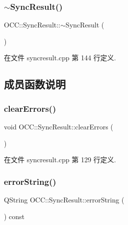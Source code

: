 \subsubsection{\texorpdfstring{$\sim$\+Sync\+Result()}{~SyncResult()}}
{\footnotesize\ttfamily O\+C\+C\+::\+Sync\+Result\+::$\sim$\+Sync\+Result (\begin{DoxyParamCaption}{ }\end{DoxyParamCaption})}



在文件 syncresult.\+cpp 第 144 行定义.



\subsection{成员函数说明}
\mbox{\label{class_o_c_c_1_1_sync_result_a05cf060d003232f0ea6b73c6ab9d95b2}} 
\subsubsection{\texorpdfstring{clear\+Errors()}{clearErrors()}}
{\footnotesize\ttfamily void O\+C\+C\+::\+Sync\+Result\+::clear\+Errors (\begin{DoxyParamCaption}{ }\end{DoxyParamCaption})}



在文件 syncresult.\+cpp 第 129 行定义.

\mbox{\label{class_o_c_c_1_1_sync_result_af577eeccf50c64f2fa86ffe75f177c1e}} 
\subsubsection{\texorpdfstring{error\+String()}{errorString()}}
{\footnotesize\ttfamily Q\+String O\+C\+C\+::\+Sync\+Result\+::error\+String (\begin{DoxyParamCaption}{ }\end{DoxyParamCaption}) const}



